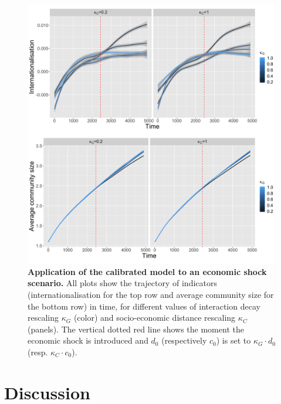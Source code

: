 \documentclass[10pt,letterpaper]{article}
\providecommand{\DIFaddbeginFL}{} %
\providecommand{\DIFaddendFL}{} %
\begin{document}
\begin{figure}
    \DIFaddbeginFL \begin{center}
    \includegraphics[width=\linewidth]{figures/Fig9.png}
    \end{center}
    \DIFaddendFL \vspace{2cm}
	\caption{\textbf{Application of the calibrated model to an economic shock scenario.} All plots show the trajectory of indicators (internationalisation for the top row and average community size for the bottom row) in time, for different values of interaction decay rescaling $\kappa_G$ (color) and socio-economic distance rescaling $\kappa_C$ (panels). The vertical dotted red line shows the moment the economic shock is introduced and $d_0$ (respectively $c_0$) is set to $\kappa_G \cdot d_0$ (resp. $\kappa_C \cdot c_0$).\label{fig:fig9}}
\end{figure}



\section*{Discussion}
\end{document}
